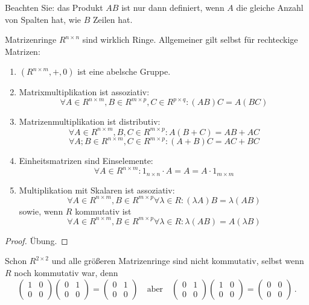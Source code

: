 \begin{remark}
    Beachten Sie: das Produkt $AB$ ist nur dann definiert, wenn $A$ die gleiche
    Anzahl von Spalten hat, wie $B$ Zeilen hat.
\end{remark}


\begin{lemma}[Ringeigenschaften]
    \label{matrizen:ring_eigenschaften}
    Matrizenringe $R^{n\times n}$ sind wirklich Ringe. Allgemeiner gilt selbst für rechteckige Matrizen:
    \begin{enumerate}
        \item $(R^{n\times m},+,0)$ ist eine abelsche Gruppe.
        \item Matrixmultiplikation ist assoziativ:
        \[\forall A\in R^{n\times m}, B\in R^{m\times p}, C\in R^{p\times q}: (AB)C = A(BC)\]
        \item Matrizenmultiplikation ist distributiv:
        \[\forall A\in R^{n\times m}, B,C\in R^{m\times p} : A(B+C) = AB+AC\]
        \[\forall A;B\in R^{n\times m}, C\in R^{m\times p} : (A+B)C = AC+BC\]
        \item Einheitsmatrizen sind Einselemente:
        \[\forall A \in R^{n \times m}: 1_{n\times n} \cdot A = A = A\cdot 1_{m\times m}\]
        \item Multiplikation mit Skalaren ist assoziativ:
        \[\forall A\in R^{n\times m}, B\in R^{m\times p}\forall \lambda\in R: (\lambda A)B = \lambda (AB)\]
        sowie, wenn $R$ kommutativ ist
        \[\forall A\in R^{n\times m}, B\in R^{m\times p}\forall \lambda\in R: \lambda (AB)=A(\lambda B)\]
    \end{enumerate}
\end{lemma}

\begin{proof}
    Übung.
\end{proof}

\begin{example}
    Schon $R^{2\times 2}$ und alle größeren Matrizenringe sind nicht kommutativ, selbst wenn $R$ noch kommutativ war, denn
    \[
        \begin{pmatrix}
            1& 0\\0& 0
        \end{pmatrix}
        \begin{pmatrix}
            0& 1\\0& 0
        \end{pmatrix}
        = \begin{pmatrix}
              0& 1\\0& 0
        \end{pmatrix}
        \quad \text{aber} \quad
        \begin{pmatrix}
            0& 1\\0& 0
        \end{pmatrix}
        \begin{pmatrix}
            1& 0\\0& 0
        \end{pmatrix}
        = \begin{pmatrix}
              0& 0\\0& 0
        \end{pmatrix} \, .
    \]
\end{example}
